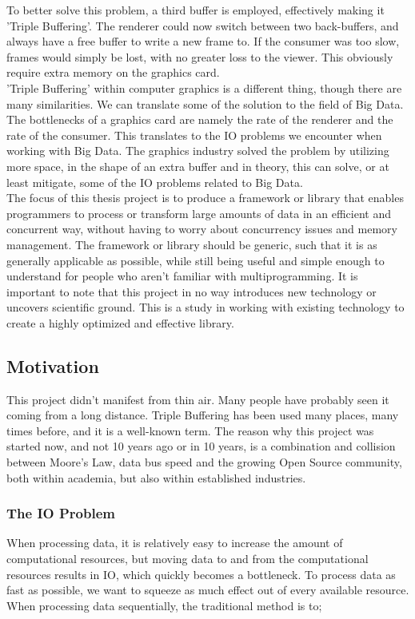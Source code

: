 \documentclass[a4paper]{article}
\begin{document}
To better solve this problem, a third buffer is employed, effectively making it 'Triple Buffering'. The renderer could now
switch between two back-buffers, and always have a free buffer to write a new frame to. If the consumer was too slow, frames
would simply be lost, with no greater loss to the viewer. This obviously require extra memory on the graphics card.\\



'Triple Buffering' within computer graphics is a different thing, though there are many similarities. We can translate some of the solution
to the field of Big Data. The bottlenecks of a graphics card are namely the rate of the renderer and the rate of the consumer. This translates to the IO problems we encounter when working with Big Data. The graphics industry solved the problem by utilizing more space, in the shape of an extra buffer
and in theory, this can solve, or at least mitigate, some of the IO problems related to Big Data.\\



The focus of this thesis project is to produce a framework or library that enables programmers to process or transform
large amounts of data in an efficient and concurrent way, without having to worry about concurrency issues and memory
management. The framework or library should be generic, such that it is as generally applicable as possible, while still
being useful and simple enough to understand for people who aren't familiar with multiprogramming. It is important to note
that this project in no way introduces new technology or uncovers scientific ground. This is a
study in working with existing technology to create a highly optimized and effective library.



\subsection{Motivation}
This project didn't manifest from thin air. Many people have probably seen it coming from a long
distance. Triple Buffering has been used many places, many times before, and it is a well-known
term. The reason why this project was started now, and not 10 years ago or in 10 years, is a combination and collision between
Moore's Law, data bus speed and the growing Open Source community, both within academia, but also within established industries.


\subsubsection{The IO Problem}
When processing data, it is relatively easy to increase the amount of computational resources, but moving
data to and from the computational resources results in IO, which quickly becomes a bottleneck. To process
data as fast as possible, we want to squeeze as much effect out of every available resource. When
processing data sequentially, the traditional method is to;
\end{document}
